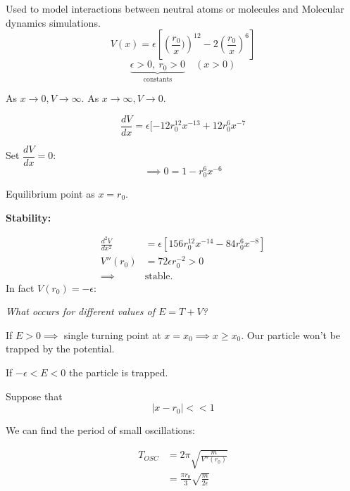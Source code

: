 \documentclass[10pt]{scrartcl}
\begin{document}
\begin{example}

Used to model interactions between neutral atoms or molecules and Molecular dynamics simulations.
\[V(x) = \epsilon\left[\left(\frac{r_0}{x})\right)^{12} -2\left(\frac{r_0}{x}\right)^6\right]\]
\[\underbrace{\epsilon >0,~r_0 > 0}_{\text{constants}}\quad (x>0)\]

As $x \to 0, V \to \infty$. As $x \to \infty, V \to 0$. 

\[\frac{dV}{dx} = \epsilon[-12r_0^{12}x^{-13} + 12r_0^6x^{-7}\]

Set $\dfrac{dV}{dx} = 0$:
\[\implies 0 = 1-r_0^6x^{-6}\]

Equilibrium point as $x = r_0$. 

\textbf{Stability:} 

\[
\begin{aligned}
  \frac{d^2V}{dx^2} &= \epsilon[156r_0^{12}x^{-14} -84r_0^6x^{-8}]\\
  V''(r_0) &= 72\epsilon r_0^{-2} > 0\\
  \implies &\text{stable.}
\end{aligned}
\]
In fact $V(r_0) = -\epsilon$: 
  \begin{center}
  \end{center}
  
  	 
\emph{What occurs for different values of $E = T + V$?}

If $E >0 \implies$ single turning point at $x = x_0 \implies x \geq x_0$. Our particle won't be trapped by the potential. 

If $-\epsilon < E < 0$ the particle is trapped. 

Suppose that 
\[|x-r_0| << 1\]

We can find the period of small oscillations: 

\[
\begin{aligned}
  T_{OSC} &= 2\pi\sqrt{\frac{m}{V''(r_0)}}\\
  &= \frac{\pi r_0}{3}\sqrt{\frac{m}{2\epsilon}}
\end{aligned}
\]

\end{example}~
\end{document}
